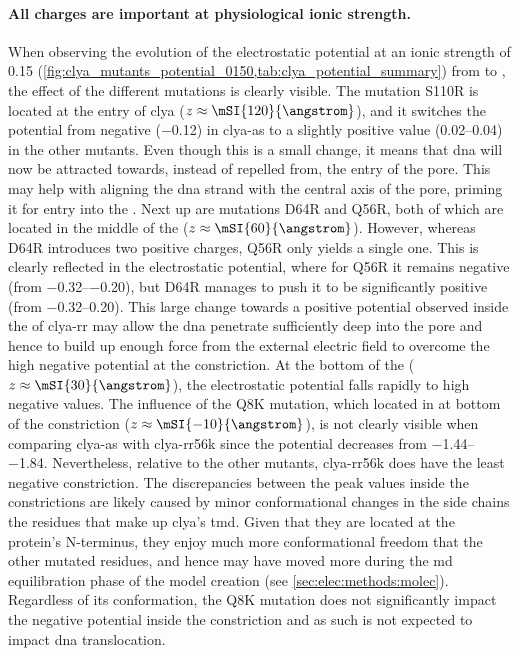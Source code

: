\paragraph{All charges are important at physiological ionic strength.}
%
%
When observing the evolution of the electrostatic potential at an ionic strength of \SI{0.15}{\Molar}
(\cref{fig:clya_mutants_potential_0150,tab:clya_potential_summary}) from \cisi{} to \transi{}, the effect of
the different mutations is clearly visible. The mutation S110R is located at the \cisi{} entry of \gls{clya}
($z \approx \mSI{120}{\angstrom}$), and it switches the potential from negative (\SI{-0.12}{\kTe}) in
\gls{clya-as} to a slightly positive value (\SIrange{+0.02}{0.04}{\kTe}) in the other mutants. Even though
this is a small change, it means that \gls{dna} will now be attracted towards, instead of repelled from, the
\cisi{} entry of the pore. This may help with aligning the \gls{dna} strand with the central axis of the pore,
priming it for entry into the \lumen{}. Next up are mutations D64R and Q56R, both of which are located in the
middle of the \lumen{} ($z \approx \mSI{60}{\angstrom}$). However, whereas D64R introduces two positive
charges, Q56R only yields a single one. This is clearly reflected in the electrostatic potential, where for
Q56R it remains negative (from \SIrange{-0.32}{-0.20}{\kTe}), but D64R manages to push it to be significantly
positive (from \SIrange{-0.32}{+0.20}{\kTe}). This large change towards a positive potential observed inside
the \lumen{} of \gls{clya-rr} may allow the \gls{dna} penetrate sufficiently deep into the pore and hence to
build up enough force from the external electric field to overcome the high negative potential at the
\transi{} constriction. At the bottom of the \lumen{} ($z \approx \mSI{30}{\angstrom}$), the electrostatic
potential falls rapidly to high negative values. The influence of the Q8K mutation, which located in at bottom
of the constriction ($z \approx \mSI{-10}{\angstrom}$), is not clearly visible when comparing \gls{clya-as}
with \gls{clya-rr56k} since the potential decreases from \SIrange{-1.44}{-1.84}{\kTe}. Nevertheless, relative
to the other mutants, \gls{clya-rr56k} does have the least negative constriction. The discrepancies between
the peak values inside the constrictions are likely caused by minor conformational changes in the side chains
the residues that make up \gls{clya}'s \gls{tmd}. Given that they are located at the protein's N-terminus,
they enjoy much more conformational freedom that the other mutated residues, and hence may have moved more
during the \gls{md} equilibration phase of the model creation (see \cref{sec:elec:methods:molec}). Regardless
of its conformation, the Q8K mutation does not significantly impact the negative potential inside the
constriction and as such is not expected to impact \gls{dna} translocation. 



